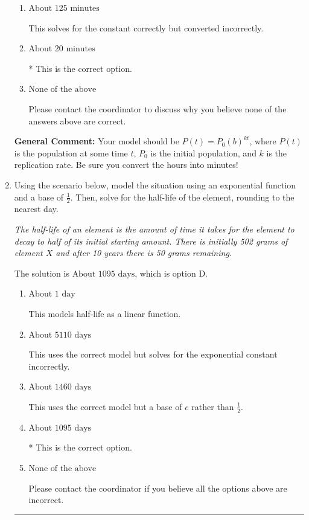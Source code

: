 \documentclass{extbook}[14pt]
\newcommand{\litem}[1]{\item #1

\rule{\textwidth}{0.4pt}}
\begin{document}
\begin{enumerate}
{\begin{enumerate}[label=\Alph*.]
This does not solve for the constant correctly.
\item \( \text{About } 125 \text{ minutes} \)

This solves for the constant correctly but converted incorrectly.
\item \( \text{About } 20 \text{ minutes} \)

* This is the correct option.
\item \( \text{None of the above} \)

Please contact the coordinator to discuss why you believe none of the answers above are correct.
\end{enumerate}

\textbf{General Comment:} Your model should be $P(t) = P_0(b)^{kt}$, where $P(t)$ is the population at some time $t$, $P_0$ is the initial population, and $k$ is the replication rate. Be sure you convert the hours into minutes!
}
\litem{
Using the scenario below, model the situation using an exponential function and a base of $\frac{1}{2}$. Then, solve for the half-life of the element, rounding to the nearest day.

\begin{center}
    \textit{ The half-life of an element is the amount of time it takes for the element to decay to half of its initial starting amount. There is initially 502 grams of element $X$ and after 10 years there is 50 grams remaining. }
\end{center}
The solution is \( \text{About } 1095 \text{ days} \), which is option D.\begin{enumerate}[label=\Alph*.]
\item \( \text{About } 1 \text{ day} \)

This models half-life as a linear function.
\item \( \text{About } 5110 \text{ days} \)

This uses the correct model but solves for the exponential constant incorrectly.
\item \( \text{About } 1460 \text{ days} \)

This uses the correct model but a base of $e$ rather than $\frac{1}{2}$.
\item \( \text{About } 1095 \text{ days} \)

* This is the correct option.
\item \( \text{None of the above} \)

Please contact the coordinator if you believe all the options above are incorrect.
\end{enumerate}

}
\end{enumerate}
\end{document}
